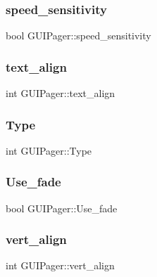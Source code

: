 \subsubsection{\texorpdfstring{speed\+\_\+sensitivity}{speed\_sensitivity}}
{\footnotesize\ttfamily bool G\+U\+I\+Pager\+::speed\+\_\+sensitivity}

\hypertarget{class_g_u_i_pager_ac5ab626e5806dbb460a62b52e31d2f8d}{}\label{class_g_u_i_pager_ac5ab626e5806dbb460a62b52e31d2f8d} 
\subsubsection{\texorpdfstring{text\+\_\+align}{text\_align}}
{\footnotesize\ttfamily int G\+U\+I\+Pager\+::text\+\_\+align}

\hypertarget{class_g_u_i_pager_a6446fa8bb2b3034030165bbe35a436f9}{}\label{class_g_u_i_pager_a6446fa8bb2b3034030165bbe35a436f9} 
\subsubsection{\texorpdfstring{Type}{Type}}
{\footnotesize\ttfamily int G\+U\+I\+Pager\+::\+Type}

\hypertarget{class_g_u_i_pager_aaec2e05c2bffc33ca5ad9d7b7b8499c8}{}\label{class_g_u_i_pager_aaec2e05c2bffc33ca5ad9d7b7b8499c8} 
\subsubsection{\texorpdfstring{Use\+\_\+fade}{Use\_fade}}
{\footnotesize\ttfamily bool G\+U\+I\+Pager\+::\+Use\+\_\+fade}

\hypertarget{class_g_u_i_pager_aff77db15d12e10a376a8368275a8d8eb}{}\label{class_g_u_i_pager_aff77db15d12e10a376a8368275a8d8eb} 
\subsubsection{\texorpdfstring{vert\+\_\+align}{vert\_align}}
{\footnotesize\ttfamily int G\+U\+I\+Pager\+::vert\+\_\+align}

